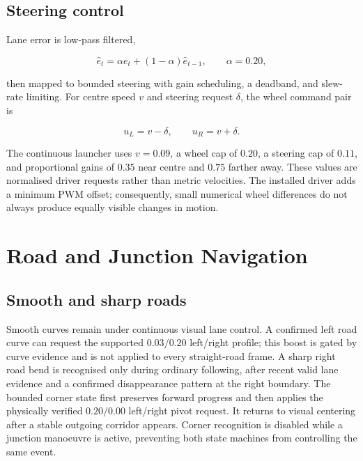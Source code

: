 \documentclass[10pt,a4paper,twocolumn]{article}
\begin{document}
\subsection{Steering control}

Lane error is low-pass filtered,

\begin{equation}
 \hat e_t=\alpha e_t+(1-\alpha)\hat e_{t-1}, \qquad \alpha=0.20,
\end{equation}

then mapped to bounded steering with gain scheduling, a deadband, and slew-rate
limiting. For centre speed $v$ and steering request $\delta$, the wheel command
pair is

\begin{equation}
 u_L=v-\delta, \qquad u_R=v+\delta .
\end{equation}

The continuous launcher uses $v=0.09$, a wheel cap of $0.20$, a steering cap of
$0.11$, and proportional gains of $0.35$ near centre and $0.75$ farther away.
These values are normalised driver requests rather than metric velocities. The
installed driver adds a minimum PWM offset; consequently, small numerical wheel
differences do not always produce equally visible changes in motion.

\section{Road and Junction Navigation}

\subsection{Smooth and sharp roads}

Smooth curves remain under continuous visual lane control. A confirmed left
road curve can request the supported $0.03/0.20$ left/right profile; this boost
is gated by curve evidence and is not applied to every straight-road frame. A sharp right road
bend is recognised only during ordinary following, after recent valid lane
evidence and a confirmed disappearance pattern at the right boundary. The
bounded corner state first preserves forward progress and then applies the
physically verified $0.20/0.00$ left/right pivot request. It returns to visual
centering after a stable outgoing corridor appears. Corner recognition is
disabled while a junction manoeuvre is active, preventing both state machines
from controlling the same event.
\end{document}
